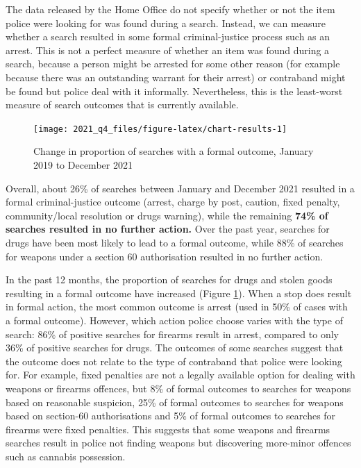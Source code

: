 \documentclass[
  a4paper,
  twoside, 11pt]{article}
\begin{document}
The data released by the Home Office do not specify whether or not the item police were looking for was found during a search. Instead, we can measure whether a search resulted in some formal criminal-justice process such as an arrest. This is not a perfect measure of whether an item was found during a search, because a person might be arrested for some other reason (for example because there was an outstanding warrant for their arrest) or contraband might be found but police deal with it informally. Nevertheless, this is the least-worst measure of search outcomes that is currently available.



\begin{figure}[tb]

{\centering \texttt{[image: 2021\_q4\_files/figure-latex/chart-results-1]} 

}

\caption{Change in proportion of searches with a formal outcome, January 2019 to December 2021}\label{fig:chart-results}
\end{figure}

Overall, about 26\% of searches between January and December 2021 resulted in a formal criminal-justice outcome (arrest, charge by post, caution, fixed penalty, community/local resolution or drugs warning), while the remaining \textbf{74\% of searches resulted in no further action.} Over the past year, searches for drugs have been most likely to lead to a formal outcome, while 88\% of searches for weapons under a section 60 authorisation resulted in no further action.

In the past 12 months, the proportion of searches for drugs and stolen goods resulting in a formal outcome have increased (Figure \ref{fig:chart-results}). When a stop does result in formal action, the most common outcome is arrest (used in 50\% of cases with a formal outcome). However, which action police choose varies with the type of search: 86\% of positive searches for firearms result in arrest, compared to only 36\% of positive searches for drugs. The outcomes of some searches suggest that the outcome does not relate to the type of contraband that police were looking for. For example, fixed penalties are not a legally available option for dealing with weapons or firearms offences, but 8\% of formal outcomes to searches for weapons based on reasonable suspicion, 25\% of formal outcomes to searches for weapons based on section-60 authorisations and 5\% of formal outcomes to searches for firearms were fixed penalties. This suggests that some weapons and firearms searches result in police not finding weapons but discovering more-minor offences such as cannabis possession.
\end{document}
